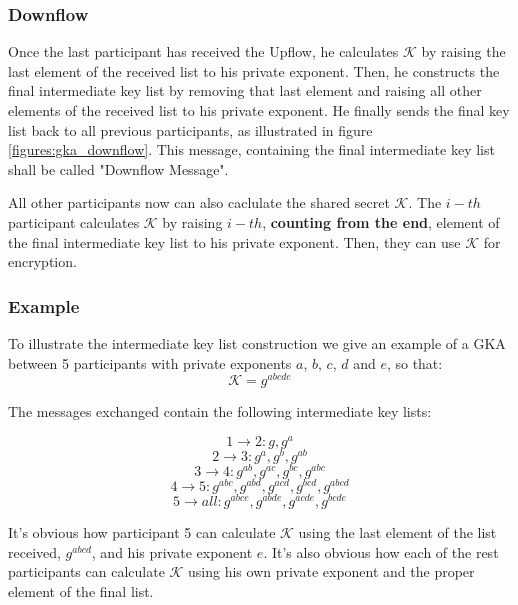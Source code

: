 \subsubsection{Downflow}
Once the last participant has received the Upflow, he calculates $\mathcal{K}$ by raising the last element of the received list to his private exponent. Then, he constructs the final intermediate key list by removing that last element and raising all other elements of the received list to his private exponent. He finally sends the final key list back to all previous participants, as illustrated in figure \ref{figures:gka_downflow}. This message, containing the final intermediate key list shall be called "Downflow Message".

All other participants now can also caclulate the shared secret $\mathcal{K}$. The $i-th$ participant calculates $\mathcal{K}$ by raising $i-th$, {\bf counting from the end}, element of the final intermediate key list to his private exponent. Then, they can use $\mathcal{K}$ for encryption.

\begin{algorithm}[t]
  
\end{algorithm}

\begin{algorithm}[t]
  
\end{algorithm}

\begin{algorithm}[p]
  
\end{algorithm}

\subsubsection{Example}
To illustrate the intermediate key list construction we give an example of a GKA between 5 participants with private exponents $a$, $b$, $c$, $d$ and $e$, so that:
\[
\mathcal{K} = g^{abcde}
\]

The messages exchanged contain the following intermediate key lists:

\[ 1 \rightarrow 2: g, g^a \]
\[ 2 \rightarrow 3: g^a, g^b, g^{ab} \]
\[ 3 \rightarrow 4: g^{ab}, g^{ac}, g^{bc}, g^{abc} \]
\[ 4 \rightarrow 5: g^{abc}, g^{abd}, g^{acd}, g^{bcd}, g^{abcd} \]
\[ 5 \rightarrow all: g^{abce}, g^{abde}, g^{acde}, g^{bcde} \]

It's obvious how participant 5 can calculate $\mathcal{K}$ using the last element of the list received, $g^{abcd}$, and his private exponent $e$. It's also obvious how each of the rest participants can calculate $\mathcal{K}$ using his own private exponent and the proper element of the final list.


